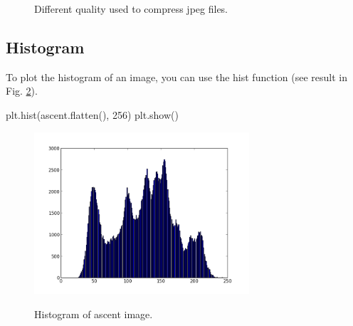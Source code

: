 \begin{figure}[H]
 \centering\caption{Different quality used to compress jpeg files.}%
 \hfill
 \hfill 
 \label{fig:introduction:python:jpeg}%
\end{figure}



\subsection{Histogram}
To plot the histogram of an image, you can use the hist function (see result in Fig. \ref{fig:histo}).
\begin{python}
plt.hist(ascent.flatten(), 256)
plt.show()
\end{python}
\begin{figure}[H]
 \centering\caption{Histogram of ascent image.}%
 \includegraphics[width=8cm]{histo.png}%
 \vspace*{-5pt}%
 \label{fig:histo}%
\end{figure}

